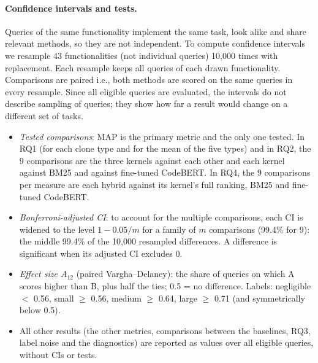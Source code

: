 \documentclass[10pt]{article}
\begin{document}
\paragraph{Confidence intervals and tests.} Queries of the same functionality implement the same task, look alike
and share relevant methods, so they are not independent. To compute confidence intervals we resample 43 functionalities (not individual queries) 10,000 times with replacement. Each resample keeps all queries of each drawn functionality. %
Comparisons are paired i.e., both methods are scored on the same queries in every resample. Since all eligible queries are evaluated, the intervals do not describe sampling of queries; they show how far a result would change on a different set of tasks.
\begin{itemize}
\item \emph{Tested comparisons}: MAP is the primary metric and the only one tested. In RQ1 (for each clone type and
for the mean of the five types) and in RQ2, the 9 comparisons are the three kernels against each other and each
kernel against BM25 and against fine-tuned CodeBERT. In RQ4, the 9 comparisons per measure are each hybrid against
its kernel's full ranking, BM25 and fine-tuned CodeBERT.
\item \emph{Bonferroni-adjusted CI}: to account for the multiple comparisons, each CI is widened to the level
$1 - 0.05/m$ for a family of $m$ comparisons (99.4\% for 9): the middle 99.4\% of the 10,000
resampled differences. A difference is significant when its adjusted CI excludes 0.
\item \emph{Effect size $A_{12}$} (paired Vargha--Delaney): the share of queries on which A scores higher than B, plus
half the ties; 0.5 = no difference. Labels: negligible $<$ 0.56, small $\geq$ 0.56, medium $\geq$ 0.64, large $\geq$
0.71 (and symmetrically below 0.5).
\item All other results (the other metrics, comparisons between the baselines, RQ3, label noise and the diagnostics)
are reported as values over all eligible queries, without CIs or tests.
\end{itemize}


\end{document}
